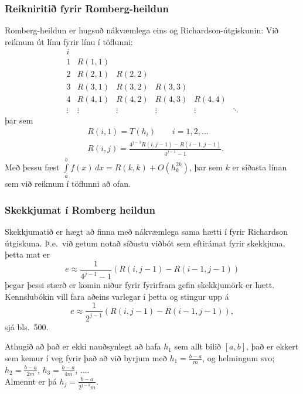 \documentclass[icelandic,a4paper,12pt]{article}
\begin{document}
\subsubsection{Reikniritið fyrir Romberg-heildun} 
Romberg-heildun er hugsuð nákvæmlega eins og Richardson-útgiskunin:
Við reiknum út línu fyrir línu í töflunni: 
\begin{equation*}
  \begin{array}{cccccc}
    i\\
    1 & R(1,1)\\
    2 & R(2,1) & R(2,2)\\
    3 & R(3,1) & R(3,2) & R(3,3)\\
    4 & R(4,1) & R(4,2) & R(4,3) & R(4,4)\\
    \vdots & \vdots & \vdots & \vdots & \vdots & \ddots
  \end{array}
\end{equation*}
þar sem
\begin{align*}
  &R(i,1) = T(h_i) \qquad i = 1,2,\ldots\\
  &R(i,j) = \frac{4^{j-1} R(i,j-1) - R(i-1,j-1)}{4^{j-1} - 1}.
\end{align*}
Með þessu fæst 
$\int\limits_a^b f(x)\, dx = R(k,k) + O(h_k^{2k})$,
þar sem $k$ er síðasta línan sem við reiknum í töflunni að ofan.


\subsubsection{Skekkjumat í Romberg heildun} 
Skekkjumatið er hægt að finna með nákvæmlega sama hætti í fyrir
Richardson útgiskuna. Þ.e.~við getum notað 
síðustu viðbót sem eftirámat fyrir skekkjuna, þetta mat er
\begin{equation*}
  e \approx \frac{1}{4^{j-1}-1}\left( R(i,j-1) - R(i-1,j-1)\right)
\end{equation*}
þegar þessi stærð er komin niður fyrir fyrirfram gefin skekkjumörk er
hætt. \pause
Kennslubókin vill fara aðeins varlegar í þetta og stingur upp á 
\begin{equation*}
  e \approx \frac{1}{2^{j-1}}\left( R(i,j-1) - R(i-1,j-1)\right),
\end{equation*}
sjá bls.~500.
\medskip\pause

Athugið að það er ekki nauðsynlegt að hafa $h_1$ sem allt bilið $[a,b]$, það er ekkert sem 
kemur í veg fyrir það að við byrjum með $h_1 = \frac{b-a}{m}$, og helmingum svo;
$h_2 = \frac{b-a}{2m}$, $h_3 = \frac{b-a}{4m}$, $\ldots$.\\
Almennt er þá $h_j=\frac{b-a}{2^{j-1}m}$.
\end{document}
